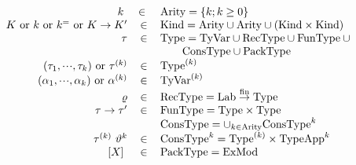 \begin{figure}[h]
\begin{displaymath}
\begin{array}{rcl}
   \k\         & \in\ & \Arity = \{\k; \k \geq 0 \} \\
   \K\ {\rm or}\ \k\ {\rm or}\ \keq\ {\rm or}\ \Karr{\K}{\K'} 
                & \in  & \Kind = \Arity \cup \Arity \cup
                                         (\Kind \times \Kind) \\
        \tau	&\in	&\Type = \TyVar\cup\RecType\cup\FunType\cup{}\\
                &       & \qquad \ConsType\cup\PackType\\
 \longtauk\ {\rm or}\ \tauk
                & \in   & \Type^{(k)}\\
 \longalphak\ {\rm or}\ \alphak
                & \in   & \TyVar^{(k)}\\
 \varrho        & \in   & \RecType = \finfun{\Lab}{\Type} \\
 \tau\rightarrow\tau'
                & \in   & \FunType = \Type\times\Type \\
                &       & \ConsType = \cup_{\k\in\Arity}\ConsType^{\k}\\
 \apptype{\tauk}{\typeapp[\k]} & \in 	& \ConsType^{k} = \Type^{(k)}\times\TypeApp[\k]  \\
 \longpackagetype\ & \in & \PackType = \ExMod \\

\end{array}
\end{displaymath}
\end{figure}
